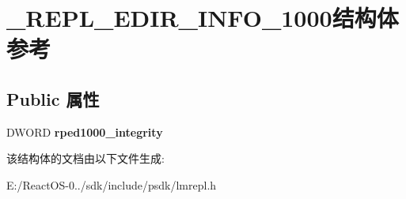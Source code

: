 \hypertarget{struct___r_e_p_l___e_d_i_r___i_n_f_o__1000}{}\section{\+\_\+\+R\+E\+P\+L\+\_\+\+E\+D\+I\+R\+\_\+\+I\+N\+F\+O\+\_\+1000结构体 参考}
\label{struct___r_e_p_l___e_d_i_r___i_n_f_o__1000}
\subsection*{Public 属性}
\begin{DoxyCompactItemize}
\item 
\mbox{\label{struct___r_e_p_l___e_d_i_r___i_n_f_o__1000_ac76469ea4f1c0861cdf105b888615da9}} 
D\+W\+O\+RD {\bfseries rped1000\+\_\+integrity}
\end{DoxyCompactItemize}


该结构体的文档由以下文件生成\+:\begin{DoxyCompactItemize}
\item 
E\+:/\+React\+O\+S-\/0../sdk/include/psdk/lmrepl.\+h\end{DoxyCompactItemize}
